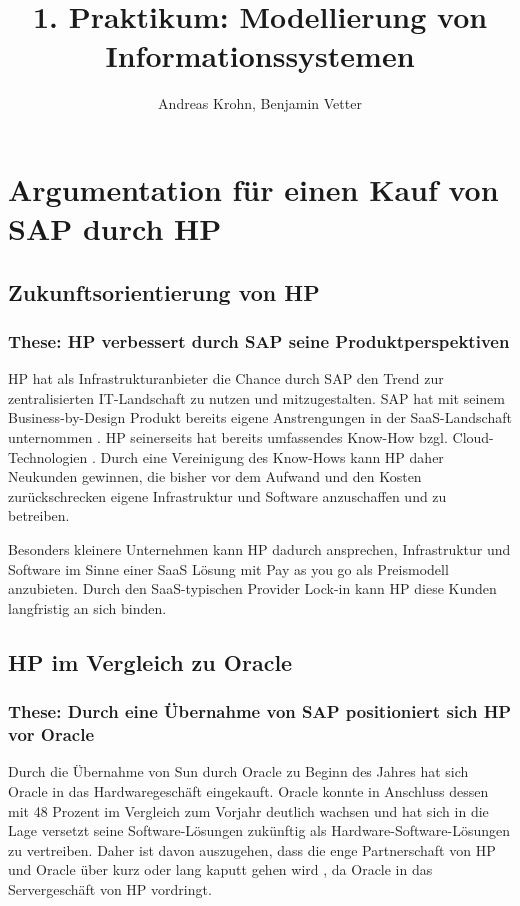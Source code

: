 \documentclass[a4paper,10pt,left=1.5cm,right=1.5cm,top=1.5cm,bottom=1.5cm]{article}
\title{1. Praktikum: Modellierung von Informationssystemen}
\author{Andreas Krohn, Benjamin Vetter}
\begin{document}
\maketitle


\section*{Argumentation für einen Kauf von SAP durch HP}

\subsection*{Zukunftsorientierung von HP}

\subsubsection*{These: HP verbessert durch SAP seine Produktperspektiven}

HP hat als Infrastrukturanbieter die Chance durch SAP den Trend zur zentralisierten IT-Landschaft zu nutzen und mitzugestalten.
SAP hat mit seinem Business-by-Design Produkt bereits eigene Anstrengungen in der SaaS-Landschaft unternommen \cite{bbd}.
HP seinerseits hat bereits umfassendes Know-How bzgl. Cloud-Technologien \cite{cioandabove}.
Durch eine Vereinigung des Know-Hows kann HP daher Neukunden gewinnen, die bisher vor dem Aufwand und den Kosten zurückschrecken eigene Infrastruktur und Software anzuschaffen und zu betreiben.

Besonders kleinere Unternehmen kann HP dadurch ansprechen, Infrastruktur und Software im Sinne einer SaaS \cite{saas} Lösung mit Pay as you go als Preismodell anzubieten.
Durch den SaaS-typischen Provider Lock-in kann HP diese Kunden langfristig an sich binden.

\subsection*{HP im Vergleich zu Oracle}

\subsubsection*{These: Durch eine Übernahme von SAP positioniert sich HP vor Oracle}

Durch die Übernahme von Sun durch Oracle zu Beginn des Jahres hat sich Oracle in das Hardwaregeschäft eingekauft.
Oracle konnte in Anschluss dessen mit 48 Prozent im Vergleich zum Vorjahr deutlich wachsen \cite{oraclegrows} und hat sich in die Lage versetzt seine Software-Lösungen zukünftig als Hardware-Software-Lösungen zu vertreiben.
Daher ist davon auszugehen, dass die enge Partnerschaft von HP und Oracle über kurz oder lang kaputt gehen wird \cite{oraclesun}, da Oracle in das Servergeschäft von HP vordringt.
\end{document}
